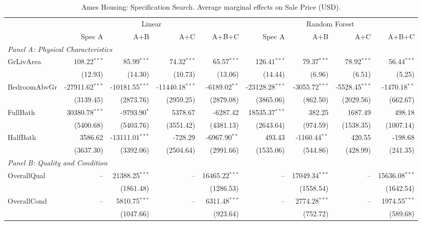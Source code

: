 \begin{table}[htbp]
\centering
\small
\begin{threeparttable}
\caption{Ames Housing: Specification Search. Average marginal effects on Sale Price (USD).}
\label{tab:ames_housing_spec_search}
\begin{tabular}{lrrrrrrrr}
\toprule
 & \multicolumn{4}{c}{Linear} & \multicolumn{4}{c}{Random Forest} \\
\cmidrule(lr){2-5} \cmidrule(lr){6-9} 
 & Spec A & A+B & A+C & A+B+C & Spec A & A+B & A+C & A+B+C \\
\midrule
\multicolumn{9}{l}{\textit{Panel A: Physical Characteristics}} \\
\quad GrLivArea & 108.22$^{***}$ & 85.99$^{***}$ & 74.32$^{***}$ & 65.57$^{***}$ & 126.41$^{***}$ & 79.37$^{***}$ & 78.92$^{***}$ & 56.44$^{***}$ \\
 & (12.93) & (14.30) & (10.73) & (13.06) & (14.44) & (6.96) & (6.51) & (5.25) \\
\quad BedroomAbvGr & -27911.62$^{***}$ & -10181.55$^{***}$ & -11440.18$^{***}$ & -6189.02$^{**}$ & -23128.28$^{***}$ & -3055.72$^{***}$ & -5528.45$^{***}$ & -1470.18$^{**}$ \\
 & (3139.45) & (2873.76) & (2959.25) & (2879.08) & (3865.06) & (862.50) & (2029.56) & (662.67) \\
\quad FullBath & 30380.78$^{***}$ & -9793.90$^{*}$ & 5378.67 & -6287.42 & 18535.37$^{***}$ & 382.25 & 1687.49 & 498.18 \\
 & (5400.68) & (5403.76) & (3551.42) & (4381.13) & (2643.64) & (974.59) & (1538.35) & (1007.14) \\
\quad HalfBath & 3586.62 & -13111.01$^{***}$ & -728.29 & -6967.90$^{**}$ & 493.43 & -1160.44$^{**}$ & 420.55 & -198.68 \\
 & (3637.30) & (3392.06) & (2504.64) & (2991.66) & (1535.06) & (544.86) & (428.99) & (241.35) \\
\midrule
\multicolumn{9}{l}{\textit{Panel B: Quality and Condition}} \\
\quad OverallQual & -- & 21388.25$^{***}$ & -- & 16465.22$^{***}$ & -- & 17049.34$^{***}$ & -- & 15636.08$^{***}$ \\
 &  & (1861.48) &  & (1286.53) &  & (1558.54) &  & (1642.54) \\
\quad OverallCond & -- & 5810.75$^{***}$ & -- & 6311.48$^{***}$ & -- & 2774.28$^{***}$ & -- & 1974.55$^{***}$ \\
 &  & (1047.66) &  & (923.64) &  & (752.72) &  & (589.68) \\

\end{tabular}
\end{threeparttable}
\end{table}
